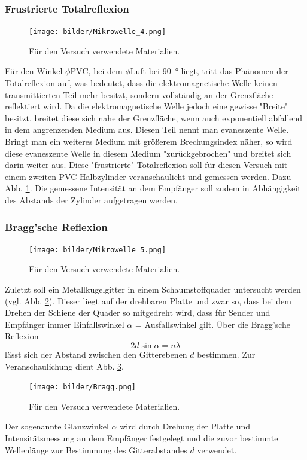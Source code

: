 		\subsubsection*{Frustrierte Totalreflexion}
		\begin{figure}[ht]
			\centering
			\texttt{[image: bilder/Mikrowelle\_4.png]}
			\caption{Für den Versuch verwendete Materialien.\cite{WWU}}
			\label{fig:Aufbau4}	
		\end{figure}
		Für den Winkel $\phi\text{PVC}$, bei dem $\phi\text{Luft}$ bei \SI{90}{\degree} liegt, tritt das Phänomen der Totalreflexion auf, was bedeutet, dass die elektromagnetische Welle keinen transmittierten Teil mehr besitzt, sondern vollständig an der Grenzfläche reflektiert wird. 
		Da die elektromagnetische Welle jedoch eine gewisse "Breite" besitzt, breitet diese sich nahe der Grenzfläche, wenn auch exponentiell abfallend in dem angrenzenden Medium aus.
		Diesen Teil nennt man evaneszente Welle.
		Bringt man ein weiteres Medium mit größerem Brechungsindex näher, so wird diese evaneszente Welle in diesem Medium "zurückgebrochen" und breitet sich darin weiter aus.
		Diese "frustrierte" Totalreflexion soll für diesen Versuch mit einem zweiten PVC-Halbzylinder veranschaulicht und gemessen werden. 
		Dazu Abb. \ref{fig:Aufbau4}.
		Die gemessene Intensität an dem Empfänger soll zudem in Abhängigkeit des Abstands der Zylinder aufgetragen werden.		
		
		\subsubsection*{Bragg'sche Reflexion}
		\begin{figure}[ht]
			\centering
			\texttt{[image: bilder/Mikrowelle\_5.png]}
			\caption{Für den Versuch verwendete Materialien.\cite{WWU}}
			\label{fig:Aufbau5}	
		\end{figure}
		Zuletzt soll ein Metallkugelgitter in einem Schaumstoffquader untersucht werden (vgl. Abb. \ref{fig:Aufbau5}). 
		Dieser liegt auf der drehbaren Platte und zwar so, dass bei dem Drehen der Schiene der Quader so mitgedreht wird, dass für Sender und Empfänger immer Einfallswinkel $\alpha$ = Ausfallswinkel gilt.
		Über die Bragg'sche Reflexion
		\begin{equation}
			2d\sin{\alpha} = n\lambda
		\end{equation}
		lässt sich der Abstand zwischen den Gitterebenen $d$ bestimmen.
		Zur Veranschaulichung dient Abb. \ref{fig:bragg}.
		\begin{figure}[ht]
			\centering
			\texttt{[image: bilder/Bragg.png]}
			\caption{Für den Versuch verwendete Materialien.\cite{WWU}}
			\label{fig:bragg}	
		\end{figure}
		Der sogenannte Glanzwinkel $\alpha$ wird durch Drehung der Platte und Intensitätsmessung an dem Empfänger festgelegt und die zuvor bestimmte Wellenlänge zur Bestimmung des Gitterabstandes $d$ verwendet. 
		
